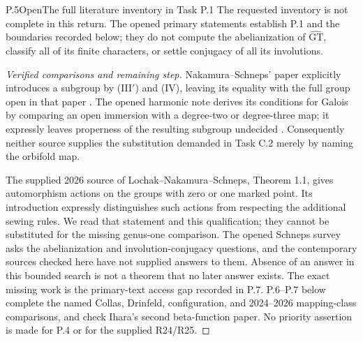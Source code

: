 \begin{statement}{P.5}{Open}{The full literature inventory in Task P.1}
The requested inventory is not complete in this return.
The opened primary statements establish P.1 and the boundaries
recorded below; they do not compute the abelianization of
$\widehat{\mathrm{GT}}$, classify all of its finite characters,
or settle conjugacy of all its involutions.
\end{statement}
\begin{proof}[Verified comparisons and remaining step]
Nakamura--Schneps' paper explicitly introduces a subgroup by
(III$'$) and (IV), leaving its equality with the full group open
in that paper \cite[\S1]{PBC_NS2000}. The opened harmonic note
derives its conditions for Galois by comparing an open immersion
with a degree-two or degree-three map; it expressly leaves
properness of the resulting subgroup undecided
\cite[\S1]{PBC_NT2002}. Consequently neither source supplies
the substitution demanded in Task C.2 merely by naming the
orbifold map.

The supplied 2026 source of Lochak--Nakamura--Schneps, Theorem 1.1,
gives automorphism actions on the groups with zero or one marked
point. Its introduction expressly distinguishes such actions
from respecting the additional sewing rules. We read that
statement and this qualification; they cannot be substituted
for the missing genus-one comparison. The opened Schneps survey
asks the abelianization and involution-conjugacy questions,
and the contemporary sources checked here have not supplied
answers to them. Absence of an answer in this bounded search
is not a theorem that no later answer exists. The exact missing
work is the primary-text access gap recorded in P.7.
P.6--P.7 below complete the named Collas, Drinfeld, configuration,
and 2024--2026 mapping-class comparisons, and check Ihara's second
beta-function paper. No priority assertion is made for P.4
or for the supplied R24/R25.
\end{proof}


